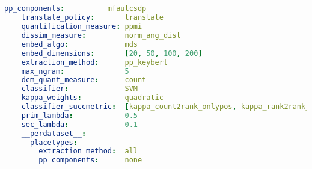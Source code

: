 
% 

\subsection{\textcite{Derrac2015}}

\begin{lstlisting}[language=yaml, caption={YAML for \textcite{Derrac2015}}]
    pp_components:          mfautcsdp
    translate_policy:       translate
    quantification_measure: ppmi
    dissim_measure:         norm_ang_dist
    embed_algo:             mds
    embed_dimensions:       [20, 50, 100, 200]
    extraction_method:      pp_keybert
    max_ngram:              5                   
    dcm_quant_measure:      count
    classifier:             SVM
    kappa_weights:          quadratic
    classifier_succmetric:  [kappa_count2rank_onlypos, kappa_rank2rank_onlypos_min] 
    prim_lambda:            0.5
    sec_lambda:             0.1
    __perdataset__:
      placetypes:
        extraction_method:  all 
        pp_components:      none
\end{lstlisting}

\subsection{\textcite{Ager2018}}





\todo 


